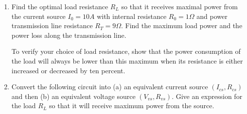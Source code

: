 \begin{enumerate}

\item Find the optimal load resistance $R_L$ so that it receives maximal
power from the current source $I_0=10A$ with internal resistance 
$R_0=1\Omega$ and power transmission line resistance $R_T=9\Omega$. 
Find the maximum load power and the power loss along the transmission 
line.


To verify your choice of load resistance, show that the power consumption
of the load will always be lower than this maximum when its resistance is 
either increased or decreased by ten percent.



\item Convert the following circuit into (a) an equivalent current 
  source $(I_{cs}, R_{cs})$ and then (b) an equivalent voltage source
  $(V_{vs}, R_{vs})$. Give an expression for the load $R_L$ so that it 
  will receive maximum power from the source.


% 
   

\end{enumerate}
